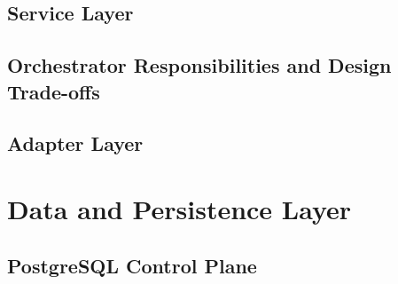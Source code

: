 \documentclass[a4paper,twoside]{sapthesis}
\begin{document}
\subsection{Service Layer}

\subsection{Orchestrator Responsibilities and Design Trade-offs}

\subsection{Adapter Layer}

\section{Data and Persistence Layer}
\label{sec:data-layer}

\subsection{PostgreSQL Control Plane}
\end{document}
